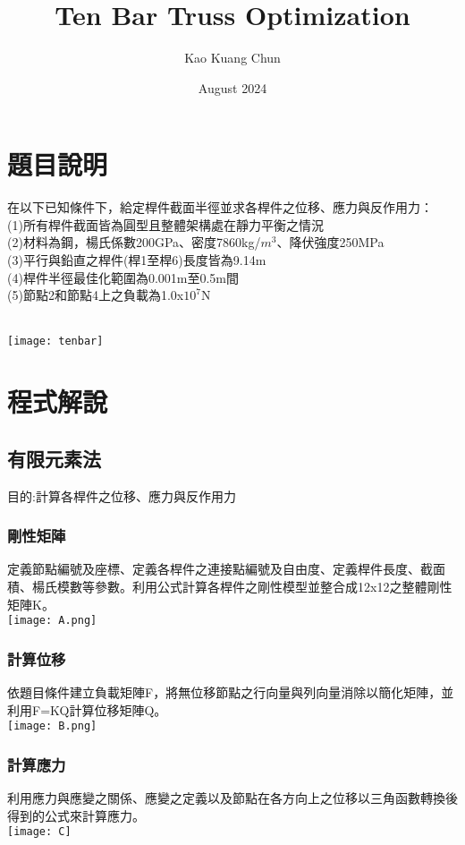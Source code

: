 \documentclass{article}
\title{Ten Bar Truss Optimization}
\author{Kao Kuang Chun}
\date{August 2024}
\begin{document}
\maketitle

\section{題目說明}
在以下已知條件下，給定桿件截面半徑並求各桿件之位移、應力與反作用力：\\
(1)所有桿件截面皆為圓型且整體架構處在靜力平衡之情況\\
(2)材料為鋼，楊氏係數200GPa、密度7860kg/$m^{3}$、降伏強度250MPa\\
(3)平行與鉛直之桿件(桿1至桿6)長度皆為9.14m\\
(4)桿件半徑最佳化範圍為0.001m至0.5m間\\
(5)節點2和節點4上之負載為1.0x$10^7$N\\
\\
\begin{center}
\texttt{[image: tenbar]}\\
\end{center}

\section{程式解說}
    \subsection{有限元素法}
        目的:計算各桿件之位移、應力與反作用力
        \subsubsection{剛性矩陣}
            定義節點編號及座標、定義各桿件之連接點編號及自由度、定義桿件長度、截面積、楊氏模數等參數。利用公式計算各桿件之剛性模型並整合成12x12之整體剛性矩陣K。\\
            \texttt{[image: A.png]}
        \subsubsection{計算位移}
            依題目條件建立負載矩陣F，將無位移節點之行向量與列向量消除以簡化矩陣，並利用F=KQ計算位移矩陣Q。\\
            \texttt{[image: B.png]}
		 \subsubsection{計算應力}
            利用應力與應變之關係、應變之定義以及節點在各方向上之位移以三角函數轉換後得到的公式來計算應力。\\\texttt{[image: C]}
\end{document}
